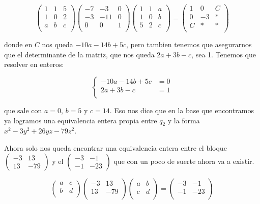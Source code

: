 \documentclass[12pt]{amsart}
\newcommand{\lp}{\left(}
\newcommand{\rp}{\right)}
\theoremstyle{plain}
\begin{document}
$$\lp\begin{matrix}
    1&1&5 \\
    1&0&2 \\
    a&b&c \\
\end{matrix}\rp
\lp\begin{matrix}
    -7&-3&0 \\
    -3&-11&0 \\
    0&0&1 \\
\end{matrix}\rp
\lp\begin{matrix}
    1&1&a \\
    1&0&b \\
    5&2&c \\
\end{matrix}\rp = 
\lp\begin{matrix}
    1&0&C\\
    0&-3&* \\
    C&*&* \\
\end{matrix}\rp$$

donde en $C$ nos queda $-10a-14b+5c$, pero tambien tenemos 
que asegurarnos que el determinante de la matriz, que nos 
queda $2a+3b-c$, sea 1. Tenemos que resolver en enteros:

$$\left\{
\begin{matrix}
    -10a-14b+5c &=0 \\
    2a+3b-c &=1 \\
\end{matrix}\right.$$

que sale con $a=0$, $b=5$ y $c=14$. Eso nos dice que en la 
base que encontramos ya logramos una equivalencia entera 
propia entre $q_2$ y la forma $x^2-3y^2+26yz-79z^2$.

Ahora solo nos queda encontrar una equivalencia entera
entre el bloque $\left(\begin{smallmatrix} -3 & 13 \\ 
13 & -79 \end{smallmatrix}\right)$ y el $\left(\begin
{smallmatrix} -3 & -1 \\ -1 & -23 \end{smallmatrix}\right)$
que con un poco de suerte ahora va a existir.

$$\lp\begin{matrix}
    a&c \\
    b&d \\
\end{matrix}\rp
\lp\begin{matrix}
    -3&13 \\
    13&-79 \\
\end{matrix}\rp
\lp\begin{matrix}
    a&b \\
    c&d \\
\end{matrix}\rp = 
\lp\begin{matrix}
    -3&-1\\
    -1&-23 \\
\end{matrix}\rp$$
\end{document}
